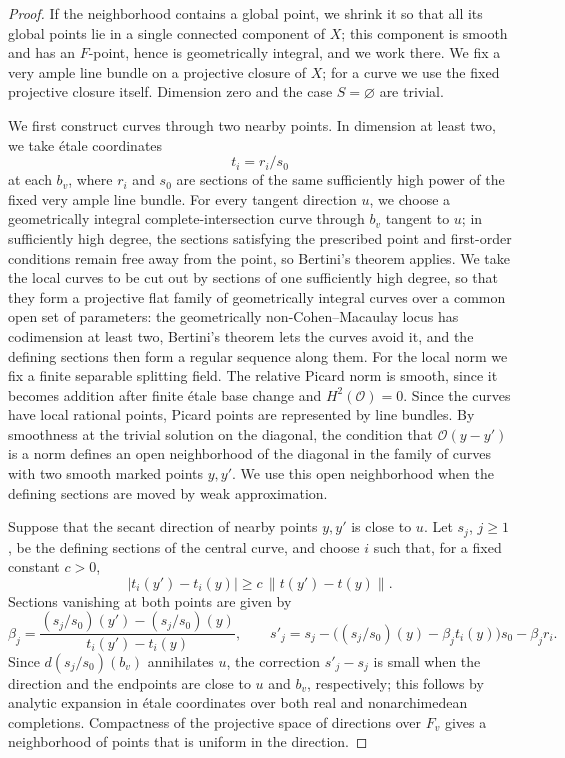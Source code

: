 \begin{proof}
If the neighborhood contains a global point, we shrink it so that all its global points lie in a single connected component of $X$; this component is smooth and has an $F$-point, hence is geometrically integral, and we work there.
We fix a very ample line bundle on a projective closure of $X$; for a curve we use the fixed projective closure itself.
Dimension zero and the case $S=\varnothing$ are trivial.

We first construct curves through two nearby points.
In dimension at least two, we take \'etale coordinates
\[
 t_i=r_i/s_0
\]
at each $b_v$, where $r_i$ and $s_0$ are sections of the same sufficiently high power of the fixed very ample line bundle.
For every tangent direction $u$, we choose a geometrically integral complete-intersection curve through $b_v$ tangent to $u$; in sufficiently high degree, the sections satisfying the prescribed point and first-order conditions remain free away from the point, so Bertini's theorem applies.
We take the local curves to be cut out by sections of one sufficiently high degree, so that they form a projective flat family of geometrically integral curves over a common open set of parameters: the geometrically non-Cohen--Macaulay locus has codimension at least two, Bertini's theorem lets the curves avoid it, and the defining sections then form a regular sequence along them.
For the local norm we fix a finite separable splitting field.
The relative Picard norm is smooth, since it becomes addition after finite \'etale base change and $H^2(\mathcal O)=0$.
Since the curves have local rational points, Picard points are represented by line bundles.
By smoothness at the trivial solution on the diagonal, the condition that $\mathcal O(y-y')$ is a norm defines an open neighborhood of the diagonal in the family of curves with two smooth marked points $y,y'$.
We use this open neighborhood when the defining sections are moved by weak approximation.

Suppose that the secant direction of nearby points $y,y'$ is close to $u$.
Let $s_j$, $j\ge1$, be the defining sections of the central curve, and choose $i$ such that, for a fixed constant $c>0$,
\[
 |t_i(y')-t_i(y)|\ge c\,\|t(y')-t(y)\|.
\]
Sections vanishing at both points are given by
\[
 \beta_j=\frac{(s_j/s_0)(y')-(s_j/s_0)(y)}{t_i(y')-t_i(y)},\qquad
 s'_j=s_j-\bigl((s_j/s_0)(y)-\beta_j t_i(y)\bigr)s_0-\beta_jr_i.
\]
Since $d(s_j/s_0)(b_v)$ annihilates $u$, the correction $s'_j-s_j$ is small when the direction and the endpoints are close to $u$ and $b_v$, respectively; this follows by analytic expansion in \'etale coordinates over both real and nonarchimedean completions.
Compactness of the projective space of directions over $F_v$ gives a neighborhood of points that is uniform in the direction.


\end{proof}
